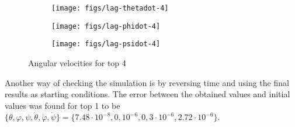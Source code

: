 \begin{figure}[H]
  \centering
  \begin{subfigure}{0.49\textwidth}
    \texttt{[image: figs/lag-thetadot-4]}
    \caption{}
  \end{subfigure}
  \begin{subfigure}{0.49\textwidth}
    \texttt{[image: figs/lag-phidot-4]}
    \caption{}
  \end{subfigure}
  \begin{subfigure}{0.49\textwidth}
    \texttt{[image: figs/lag-psidot-4]}
    \caption{}
  \end{subfigure}
  \caption{Angular velocities for top 4}
\end{figure}

Another way of checking the simulation is by reversing time and using the final results as starting conditions. The error between the obtained values and initial values was found for top 1 to be $\{\theta,\varphi,\psi,\dot{\theta},\dot{\varphi},\dot{\psi}\}=\{7.48\cdot 10^{-8},0,10^{-6},0,3\cdot 10^{-6},2.72\cdot 10^{-6}\}$.

